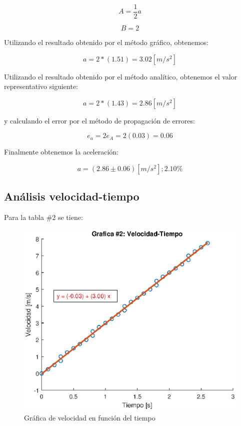 \documentclass[letter,11pt]{article}
\begin{document}
\begin{equation*}
    A = \frac{1}{2} a
\end{equation*}

\begin{equation*}
    B = 2
\end{equation*}

Utilizando el resultado obtenido por el método gráfico, obtenemos:

\begin{equation}
    a = 2 * (1.51) = 3.02 [m/s^2]
\end{equation}

Utilizando el resultado obtenido por el método analítico, obtenemos el valor
representativo siguiente:

\begin{equation*}
    a = 2 * (1.43) = 2.86 [m/s^2]
\end{equation*}

y calculando el error por el método de propagación de errores:

\begin{equation*}
    e_a = 2 e_A = 2 (0.03) = 0.06
\end{equation*}

Finalmente obtenemos la aceleración:

\begin{equation}
    a = (2.86 \pm 0.06)[m/s^2];2.10\%
\end{equation}

\subsection{Análisis velocidad-tiempo}
Para la tabla \#2 se tiene:

\begin{figure}[!h]
\centering
\includegraphics[scale=1.00]{resources/6.2.1.eps}
\caption{Gráfica de velocidad en función del tiempo}
\label{practica63}
\end{figure}
\end{document}
